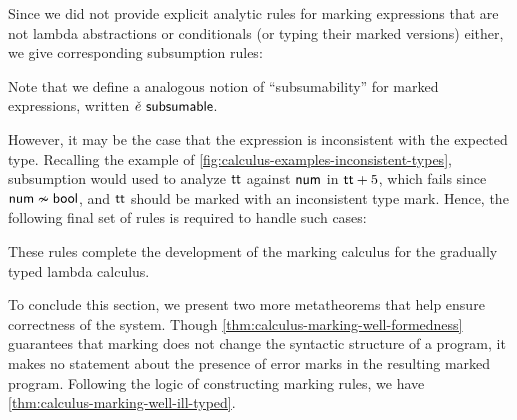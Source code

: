 Since we did not provide explicit analytic rules for marking expressions that are not lambda
abstractions or conditionals (or typing their marked versions) either, we give corresponding
subsumption rules:
%
\begin{mathpar}

\end{mathpar}
%
Note that we define a analogous notion of ``subsumability'' for marked expressions, written
$\subsumable{\ECMV}$.

However, it may be the case that the expression is inconsistent with the expected type. Recalling
the example of \cref{fig:calculus-examples-inconsistent-types}, subsumption would used to analyze
$\ETrue$ against $\TNum$ in $\EPlus{\ETrue}{5}$, which fails since $\inconsistent{\TNum}{\TBool}$,
and $\ETrue$ should be marked with an inconsistent type mark. Hence, the following final set of
rules is required to handle such cases:
%
\begin{mathpar}

\end{mathpar}
%
These rules complete the development of the marking calculus for the gradually typed lambda
calculus.


To conclude this section, we present two more metatheorems that help ensure correctness of the
system. Though \cref{thm:calculus-marking-well-formedness} guarantees that marking does not change
the syntactic structure of a program, it makes no statement about the presence of error marks in the
resulting marked program. Following the logic of constructing marking rules, we have
\cref{thm:calculus-marking-well-ill-typed}.

